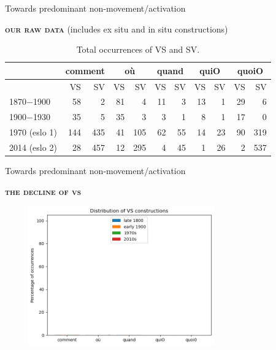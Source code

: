 \documentclass[lesson_slides]{subfiles}
\begin{document}
\begin{frame}[c]{Towards predominant non-movement/activation}

    \textbf{\textsc{our raw data}} \pause (includes ex situ and in situ constructions) \pause

    \begin{table}[H]
    \centering
    \small
    \begin{adjustbox}
        \begin{tabular}{l|rr|rr|rr|rr|rr}
        {} & \multicolumn{2}{c}{comment}  & \multicolumn{2}{c}{où} & \multicolumn{2}{c}{quand} & \multicolumn{2}{c}{quiO}& \multicolumn{2}{c}{quoiO}\\
        \hline
        {} & VS & SV & VS & SV & VS & SV & VS & SV & VS & SV\\
        1870$-$1900 & 58 & 2 & 81 & 4 & 11 & 3 & 13 & 1 & 29 & 6\\
        1900$-$1930 & 35 & 5 & 35 & 3 & 3 & 1 & 8 & 1 & 17 & 0\\
        1970 (eslo 1) & 144 & 435 & 41 & 105 & 62 & 55 & 14 & 23 & 90 & 319 \\
        2014 (eslo 2) & 28 & 457 & 12 & 295 & 4 & 45 & 1 & 26 & 2 & 537 \\
        \hline
        \end{tabular}
    \end{adjustbox}
\caption{\label{tab:samp6}Total occurrences of VS and SV.}
\end{table}
  
\end{frame}
\begin{frame}[c]{Towards predominant non-movement/activation}

    \textbf{\textsc{the decline of vs}} \pause
    \begin{center}
        \includegraphics[width=10cm, height=6cm]{images/VS0.png}
    \end{center}
  
\end{frame}
\end{document}
